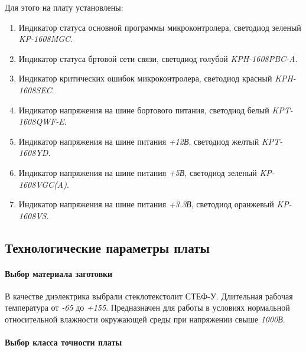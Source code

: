 \documentclass{article}
\begin{document}
Для этого на плату установлены:
\begin{enumerate}
    \item Индикатор статуса основной программы микроконтролера, светодиод зеленый \textit{KP-1608MGC}.
    \item Индикатор статуса бртовой сети связи, светодиод голубой \textit{KPH-1608PBC-A}.
    \item Индикатор критических ошибок микроконтролера, светодиод красный \textit{KPH-1608SEC}.
    \item Индикатор напряжения на шине бортового питания, светодиод белый \textit{KPT-1608QWF-E}.
    \item Индикатор напряжения на шине питания \textit{+12В}, светодиод желтый \textit{KPT-1608YD}.
    \item Индикатор напряжения на шине питания \textit{+5В}, светодиод зеленый \textit{KP-1608VGC(A)}.
    \item Индикатор напряжения на шине питания \textit{+3.3В}, светодиод оранжевый \textit{KP-1608VS}.
\end{enumerate}

\subsection{Технологические параметры платы}
\paragraph{Выбор материала заготовки}
В качестве диэлектрика выбрали стеклотекстолит СТЕФ-У.
Длительная рабочая температура от \textit{-65\textcelcius} до \textit{+155\textcelcius}.
Предназначен для работы в условиях нормальной относительной влажности
окружающей среды при напряжении свыше \textit{1000В}.

\paragraph{Выбор класса точности платы}


\newpage
\section[Список использованной литературы]{}
\begin{thebibliography}{30}
    
\end{thebibliography}
\end{document}
